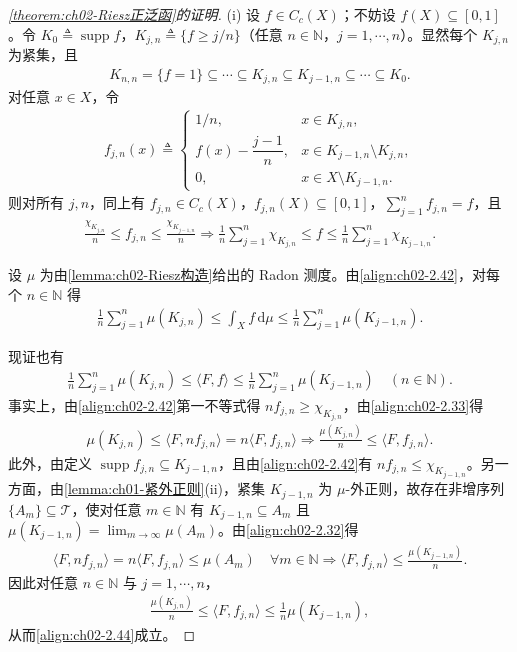 \documentclass[../../main.tex]{subfiles}%
\begin{document}
\begin{proof}[\cref{theorem:ch02-Riesz正泛函}的证明]
(i) 设 $f\in C_c(X)$；不妨设 $f(X)\subseteq[0,1]$。令 $K_0\triangleq \operatorname{supp}f$，$K_{j,n}\triangleq \{f\geqslant j/n\}$（任意 $n\in\mathbb N$，$j=1,\cdots ,n$）。显然每个 $K_{j,n}$ 为紧集，且
\begin{align*}
K_{n,n}=\{f=1\}\subseteq\cdots\subseteq K_{j,n}\subseteq K_{j-1,n}\subseteq\cdots\subseteq K_0.
\end{align*}
对任意 $x\in X$，令
\begin{align*}
f_{j,n}(x)\triangleq 
\begin{cases}
1/n, & x\in K_{j,n},\\
f(x)-\dfrac{j-1}n, & x\in K_{j-1,n}\setminus K_{j,n},\\
0, & x\in X\setminus K_{j-1,n}.
\end{cases}
\end{align*}
则对所有 $j,n$，同上有 $f_{j,n}\in C_c(X)$，$f_{j,n}(X)\subseteq[0,1]$，$\sum_{j=1}^n f_{j,n}=f$，且
\begin{align}
\frac{\chi_{K_{j,n}}}{n}\leqslant f_{j,n}\leqslant\frac{\chi_{K_{j-1,n}}}{n}
\Rightarrow\frac1n\sum_{j=1}^n\chi_{K_{j,n}}\leqslant f\leqslant\frac1n\sum_{j=1}^n\chi_{K_{j-1,n}}. \label{align:ch02-2.42}
\end{align}

设 $\mu$ 为由\cref{lemma:ch02-Riesz构造}给出的 Radon 测度。由\eqref{align:ch02-2.42}，对每个 $n\in\mathbb N$ 得
\begin{align}
\frac1n\sum_{j=1}^n\mu(K_{j,n})\leqslant\int_X f\,\mathrm{d}\mu
\leqslant\frac1n\sum_{j=1}^n\mu(K_{j-1,n}). \label{align:ch02-2.43}
\end{align}

现证也有
\begin{align}
\frac1n\sum_{j=1}^n\mu(K_{j,n})\leqslant\langle F,f\rangle
\leqslant\frac1n\sum_{j=1}^n\mu(K_{j-1,n})\quad(n\in\mathbb N). \label{align:ch02-2.44}
\end{align}
事实上，由\eqref{align:ch02-2.42}第一不等式得 $nf_{j,n}\geqslant\chi_{K_{j,n}}$，由\eqref{align:ch02-2.33}得
\begin{align*}
\mu(K_{j,n})\leqslant\langle F,nf_{j,n}\rangle=n\langle F,f_{j,n}\rangle
\Rightarrow\frac{\mu(K_{j,n})}n\leqslant\langle F,f_{j,n}\rangle.
\end{align*}
此外，由定义 $\operatorname{supp}f_{j,n}\subseteq K_{j-1,n}$，且由\eqref{align:ch02-2.42}有 $nf_{j,n}\leqslant\chi_{K_{j-1,n}}$。另一方面，由\cref{lemma:ch01-紧外正则}(ii)，紧集 $K_{j-1,n}$ 为 $\mu$-外正则，故存在非增序列 $\{A_m\}\subseteq\mathscr T$，使对任意 $m\in\mathbb N$ 有 $K_{j-1,n}\subseteq A_m$ 且 $\mu(K_{j-1,n})=\lim_{m\to\infty}\mu(A_m)$。由\eqref{align:ch02-2.32}得
\begin{align*}
\langle F,nf_{j,n}\rangle=n\langle F,f_{j,n}\rangle\leqslant\mu(A_m)\quad\forall m\in\mathbb N
\Rightarrow\langle F,f_{j,n}\rangle\leqslant\frac{\mu(K_{j-1,n})}n.
\end{align*}
因此对任意 $n\in\mathbb N$ 与 $j=1,\cdots ,n$，
\begin{align*}
\frac{\mu(K_{j,n})}n\leqslant\langle F,f_{j,n}\rangle\leqslant\frac1n\mu(K_{j-1,n}),
\end{align*}
从而\eqref{align:ch02-2.44}成立。


\end{proof}
\end{document}
